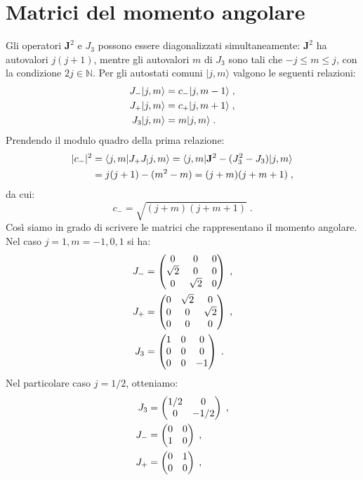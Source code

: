 \documentclass[12pt,a4paper]{report}
\theoremstyle{definition}
\numberwithin{equation}{section}
\newcommand{\bra}{\langle}
\newcommand{\ket}{\rangle}
\begin{document}
\section{Matrici del momento angolare}
Gli operatori $\mathbf{J}^2$ e $J_3$ possono essere diagonalizzati simultaneamente: $\mathbf{J}^2$ ha autovalori $j(j+1)$, mentre gli autovalori $m$ di $J_3$ sono tali che $-j\le m\le j$, con la condizione $2j\in \mathbb{N}$. Per gli autostati comuni $|j,m\ket$ valgono le seguenti relazioni:
\begin{align}
J_-|j,m\ket&=c_-|j,m-1\ket \notag\;, \\
J_+|j,m\ket &= c_+|j,m+1\ket \notag\;, \\
J_3|j,m\ket &= m|j,m\ket\;.
\end{align}
Prendendo il modulo quadro della prima relazione:
\begin{align}
|c_-|^2 &= \bra j,m|J_+J_|j,m\ket = \bra j,m|\mathbf{J}^2-(J_3^2-J_3)|j,m\ket \notag \\
&= j(j+1)-(m^2-m)=(j+m)(j+m+1)\;,
\end{align}
da cui:
\begin{equation}
c_-=\sqrt{(j+m)(j+m+1)}\;.
\end{equation}
Così siamo in grado di scrivere le matrici che rappresentano il momento angolare. Nel caso $j=1, m=-1,0,1$ si ha:
\begin{align}
J_- &=\left(\begin{matrix}
0 & 0 & 0 \\
\sqrt{2} & 0 & 0 \\
0 & \sqrt{2} & 0
\end{matrix}\right)\;, \notag \\
J_+ &=\left(\begin{matrix}
0 & \sqrt{2} & 0 \\
0 & 0 & \sqrt{2} \\
0 & 0 & 0
\end{matrix}\right)\;, \notag \\
J_3 &= \left(\begin{matrix}
1 & 0 & 0 \\
0 & 0 & 0 \\
0 & 0 & -1
\end{matrix}\right)\;.
\end{align}
Nel particolare caso $j=1/2$, otteniamo:
\begin{align}
J_3 &= \left(\begin{matrix}
1/2 & 0 \\
0 & -1/2
\end{matrix}\right)\;, \notag \\
J_-&= \left(\begin{matrix}
0 & 0 \\
1 & 0
\end{matrix}\right)\;, \notag \\
J_+ &= \left(\begin{matrix}
0 & 1 \\
0 & 0
\end{matrix}\right)\;,
\end{align}
\end{document}

